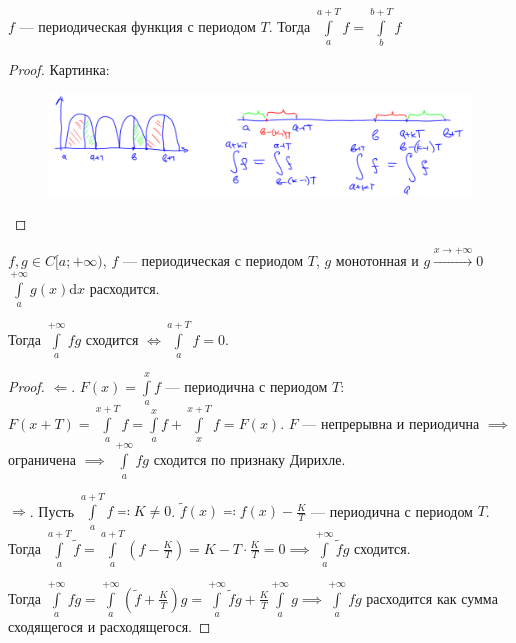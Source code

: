 \begin{statement}
    $f$ --- периодическая функция с периодом  $T$. Тогда  $\int\limits_a^{a+T} f = \int\limits_b^{b+T}f$ 
\end{statement}
\begin{proof}
    Картинка:\\
    \begin{figure}[h!]
        \includegraphics[scale=0.6]{abels_consequence}
    \end{figure}
    
\end{proof}
\begin{consequence}
   $f, g\in C[a;+\infty)$,  $f$ --- периодическая с периодом  $T$,  $g$ монотонная и $g \xrightarrow{x \to +\infty} 0$  $\int\limits_a^{+\infty} g(x) \mathrm{d}x$ расходится. 

   Тогда $\int\limits_a^{+\infty} fg$ сходится  $\iff \int\limits_a^{a+T} f = 0$.
\end{consequence}
\begin{proof}
    $\Leftarrow$.  $F(x) = \int\limits_a^x f$ --- периодична с периодом  $T$:  $F(x+T) = \int\limits_a^{x+T} f = \int\limits_a^x f + \int\limits_x^{x+T}f = F(x)$.  $F$ --- непрерывна и периодична  $\implies$ ограничена  $\implies$  $\int\limits_a^{+\infty} fg$ сходится по признаку Дирихле.

    $\Rightarrow$. Пусть  $\int\limits_a^{a+T} f \eqqcolon K \neq 0$.  $\widetilde{f}(x) \eqqcolon f(x) - \frac{K}{T}$ --- периодична с периодом $T$. Тогда  $\int\limits_a^{a+T} \widetilde{f} = \int\limits_a^{a+T}(f-\frac{K}{T}) = K - T \cdot \frac{K}{T} = 0 \implies \int\limits_a^{+\infty} \widetilde{f}g$ сходится.

    Тогда $\int\limits_a^{+\infty} fg = \int\limits_a^{+\infty}(\widetilde{f} + \frac{K}{T})g = \int\limits_a^{+\infty} \widetilde{f}g + \frac{K}{T}\int\limits_a^{+\infty} g \implies \int\limits_a^{+\infty} fg$ расходится как сумма сходящегося и расходящегося. 
\end{proof}
